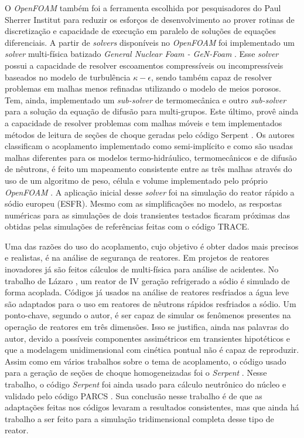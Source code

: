O \textit{OpenFOAM} também foi a ferramenta escolhida por pesquisadores do Paul Sherrer
Institut para reduzir os esforços de desenvolvimento ao prover rotinas de discretização
e capacidade de execução em paralelo de soluções de equações diferenciais. A partir
de \textit{solvers} disponíveis no \textit{OpenFOAM} foi implementado um \textit{solver}
multi-física batizado \textit{General Nuclear Foam - GeN-Foam} \cite{Fiorina2015}.
Esse \textit{solver}
possui a capacidade de resolver escoamentos compressíveis ou incompressíveis baseados
no modelo de turbulência $\kappa-\epsilon$, sendo também capaz de resolver
problemas em malhas menos refinadas utilizando o modelo de meios porosos. Tem, ainda,
implementado um \textit{sub-solver} de termomecânica e outro \textit{sub-solver} para
a solução da equação de difusão para multi-grupos. Este último, provê ainda a capacidade
de resolver problemas com malhas móveis e tem implementados métodos de leitura de seções
de choque geradas pelo código Serpent \cite{Serpent2013}. Os autores classificam
o acoplamento implementado como semi-implícito e como são usadas malhas diferentes para
os modelos termo-hidráulico, termomecânicos e de difusão de nêutrons, é feito um mapeamento
consistente entre as três malhas através do uso de um algoritmo de peso, célula e volume
implementado pelo próprio \textit{OpenFOAM} \cite{OpenFOAM2015}. A aplicação inicial desse
\textit{solver} foi na simulação do reator rápido a sódio europeu (ESFR). Mesmo com as
simplificações no modelo, as respostas numéricas para as simulações de dois transientes
testados ficaram próximas das obtidas pelas simulações de referências feitas com o
código TRACE.

Uma das razões do uso do acoplamento, cujo objetivo é obter dados mais precisos e realistas, é na 
análise de segurança de reatores. Em projetos de reatores inovadores já são feitos cálculos de multi-física para 
análise de acidentes. No trabalho de Lázaro \cite{Lazaro2013}, um reator de IV geração refrigerado a sódio 
é simulado de forma acoplada. Códigos já usados na análise de reatores resfriados a água leve são adaptados 
para o uso em reatores de nêutrons rápidos resfriados a sódio. Um ponto-chave, segundo o autor, é ser capaz 
de simular os fenômenos presentes na operação de reatores em três dimensões. Isso se justifica, ainda nas 
palavras do autor, devido a possíveis componentes assimétricos em transientes hipotéticos e que 
a modelagem unidimensional com cinética pontual não é capaz de reproduzir. Assim como em vários trabalhos 
sobre o tema de acoplamento, o código usado para a geração de seções de choque homogeneizadas 
foi o \textit{Serpent} \cite{Serpent2013}. Nesse trabalho, o código \textit{Serpent} foi ainda usado 
para cálculo neutrônico do núcleo e validado pelo código PARCS \cite{PARCS2006}. Sua conclusão nesse trabalho 
é de que as adaptações feitas nos códigos levaram a resultados consistentes, mas que ainda há trabalho 
a ser feito para a simulação tridimensional completa desse tipo de reator.


